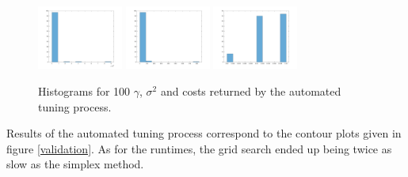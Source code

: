 \begin{figure}[h]
\centering
\includegraphics[width=0.25\textwidth]{../src/figures/iris/histogram_gamma}\quad
\includegraphics[width=0.25\textwidth]{../src/figures/iris/histogram_sigma2}\quad
\includegraphics[width=0.25\textwidth]{../src/figures/iris/histogram_cost}
\caption{Histograms for 100 $\gamma$, $\sigma^2$ and costs returned by the automated tuning process.}
\label{automatedtuninghistogram}
\end{figure}

Results of the automated tuning process correspond to the contour plots given in figure \ref{validation}. As for the runtimes, the grid search ended up being twice as slow as the simplex method.


